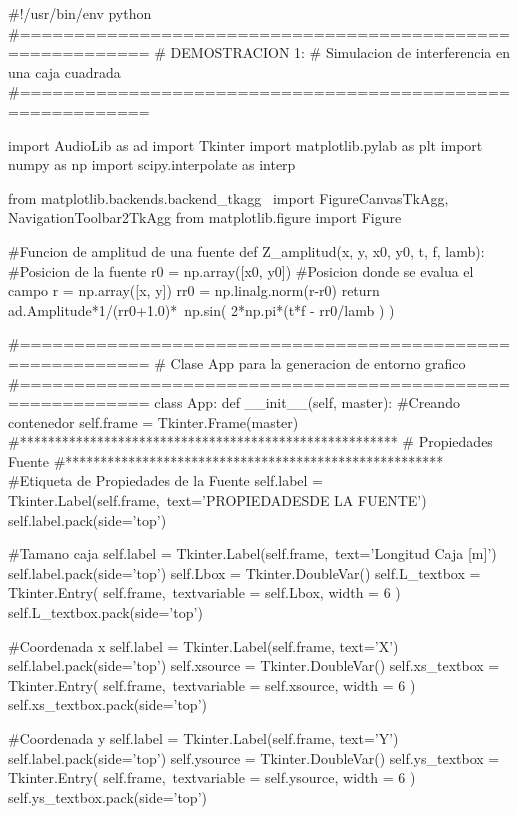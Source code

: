 \begin{listing}[style=python]
#!/usr/bin/env python
#==========================================================
# DEMOSTRACION 1:
# Simulacion de interferencia en una caja cuadrada
#==========================================================

import AudioLib as ad
import Tkinter
import matplotlib.pylab as plt
import numpy as np
import scipy.interpolate as interp

from matplotlib.backends.backend_tkagg \
import FigureCanvasTkAgg, NavigationToolbar2TkAgg
from matplotlib.figure import Figure

#Funcion de amplitud de una fuente
def Z_amplitud(x, y, x0, y0, t, f, lamb):
    #Posicion de la fuente
    r0 = np.array([x0, y0])
    #Posicion donde se evalua el campo
    r = np.array([x, y])
    rr0 = np.linalg.norm(r-r0)
    return ad.Amplitude*1/(rr0+1.0)*\
    np.sin( 2*np.pi*(t*f - rr0/lamb ) )

#==========================================================
# Clase App para la generacion de entorno grafico
#==========================================================
class App:
  def __init__(self, master):
    #Creando contenedor
    self.frame = Tkinter.Frame(master)
    #******************************************************
    #	Propiedades Fuente
    #******************************************************
    #Etiqueta de Propiedades de la Fuente
    self.label = Tkinter.Label(self.frame,\
    text='PROPIEDADES\n DE LA FUENTE')
    self.label.pack(side='top')
    
    #Tamano caja
    self.label = Tkinter.Label(self.frame,\
    text='Longitud Caja [m]')
    self.label.pack(side='top') 
    self.Lbox = Tkinter.DoubleVar()
    self.L_textbox = Tkinter.Entry( self.frame,\
    textvariable = self.Lbox, width = 6 )
    self.L_textbox.pack(side='top')

    #Coordenada x
    self.label = Tkinter.Label(self.frame, text='X')
    self.label.pack(side='top') 
    self.xsource = Tkinter.DoubleVar()
    self.xs_textbox = Tkinter.Entry( self.frame,\
    textvariable = self.xsource, width = 6 )
    self.xs_textbox.pack(side='top')
    
    #Coordenada y
    self.label = Tkinter.Label(self.frame, text='Y')
    self.label.pack(side='top') 
    self.ysource = Tkinter.DoubleVar()
    self.ys_textbox = Tkinter.Entry( self.frame,\
    textvariable = self.ysource, width = 6 )
    self.ys_textbox.pack(side='top')
        

\end{listing}
